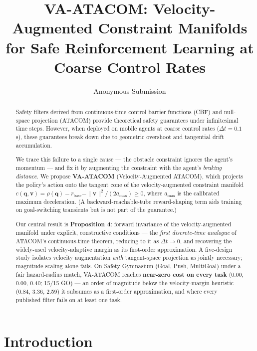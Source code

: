 \documentclass[letterpaper]{article}
\title{VA-ATACOM: Velocity-Augmented Constraint Manifolds\\for Safe Reinforcement Learning at Coarse Control Rates}
\author{
    Anonymous Submission
}
\begin{document}
\maketitle

\begin{abstract}
Safety filters derived from continuous-time control barrier functions (CBF) and null-space projection (ATACOM) provide theoretical safety guarantees under infinitesimal time steps. However, when deployed on mobile agents at coarse control rates ($\Delta t = 0.1$s), these guarantees break down due to geometric overshoot and tangential drift accumulation.

We trace this failure to a single cause --- the obstacle constraint ignores the agent's momentum --- and fix it by augmenting the constraint with the agent's \emph{braking distance}. We propose \textbf{VA-ATACOM} (Velocity-Augmented ATACOM), which projects the policy's action onto the tangent cone of the velocity-augmented constraint manifold $c(\boldsymbol{q},\boldsymbol{v}) = \rho(\boldsymbol{q}) - r_\text{base} - \|\boldsymbol{v}\|^2/(2a_{\max}) \ge 0$, where $a_{\max}$ is the calibrated maximum deceleration. (A backward-reachable-tube reward-shaping term aids training on goal-switching transients but is not part of the guarantee.)

Our central result is \textbf{Proposition 4}: forward invariance of the velocity-augmented manifold under explicit, constructive conditions --- the \emph{first discrete-time analogue} of ATACOM's continuous-time theorem, reducing to it as $\Delta t\to0$, and recovering the widely-used velocity-adaptive margin as its first-order approximation. A five-design study isolates velocity augmentation \emph{with} tangent-space projection as jointly necessary; magnitude scaling alone fails. On Safety-Gymnasium (Goal, Push, MultiGoal) under a fair hazard-radius match, VA-ATACOM reaches \textbf{near-zero cost on every task} (0.00, 0.00, 0.40; 15/15 GO) --- an order of magnitude below the velocity-margin heuristic (0.84, 3.36, 2.59) it subsumes as a first-order approximation, and where every published filter fails on at least one task.
\end{abstract}

\section{Introduction}
\end{document}
